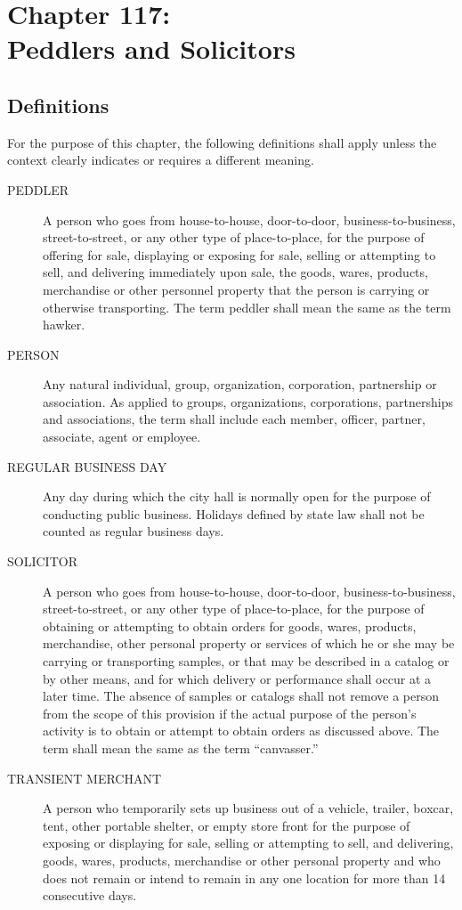 \chapter*{Chapter 117: \\
	Peddlers and Solicitors}
    \minitoc
    \pagebreak

\section{Definitions}
For the purpose of this chapter, the following definitions shall apply unless the context clearly indicates or requires a different meaning.
\begin{description}
    \item[PEDDLER] A person who goes from house-to-house, door-to-door, business-to-business, street-to-street, or any other type of place-to-place, for the purpose of offering for sale, displaying or exposing for sale, selling or attempting to sell, and delivering immediately upon sale, the goods, wares, products, merchandise or other personnel property that the person is carrying or otherwise transporting.  The term peddler shall mean the same as the term hawker.
    \item[PERSON] Any natural individual, group, organization, corporation, partnership or association.  As applied to groups, organizations, corporations, partnerships and associations, the term shall include each member, officer, partner, associate, agent or employee.
    \item[REGULAR BUSINESS DAY] Any day during which the city hall is normally open for the purpose of conducting public business.  Holidays defined by state law shall not be counted as regular business days.
    \item[SOLICITOR] A person who goes from house-to-house, door-to-door, business-to-business, street-to-street, or any other type of place-to-place, for the purpose of obtaining or attempting to obtain orders for goods, wares, products, merchandise, other personal property or services of which he or she may be carrying or transporting samples, or that may be described in a catalog or by other means, and for which delivery or performance shall occur at a later time. The absence of samples or catalogs shall not remove a person from the scope of this provision if the actual purpose of the person’s activity is to obtain or attempt to obtain orders as discussed above. The term shall mean the same as the term “canvasser.”
    \item[TRANSIENT MERCHANT] A person who temporarily sets up business out of a vehicle, trailer, boxcar, tent, other portable shelter, or empty store front for the purpose of exposing or displaying for sale, selling or attempting to sell, and delivering, goods, wares, products, merchandise or other personal property and who does not remain or intend to remain in any one location for more than 14 consecutive days.
\end{description}
